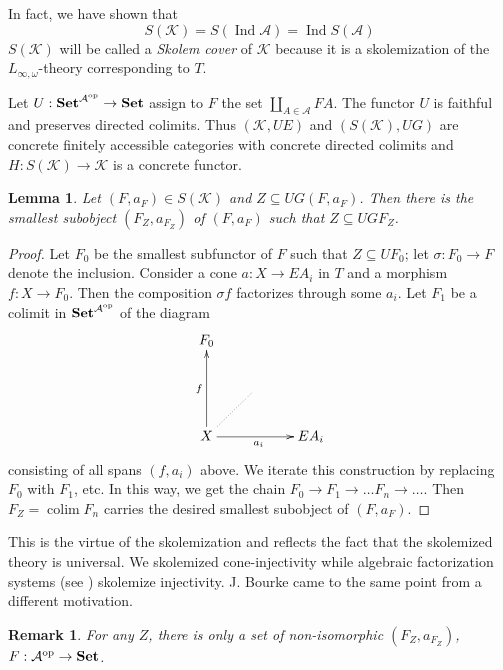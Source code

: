 \documentclass[12pt]{amsart}
\newtheorem{lemma}[theo]{Lemma}
\newtheorem{rem}[theo]{Remark}
\newcommand\Ind{\operatorname{Ind}}
\newcommand\op{\operatorname{op}}
\newcommand\Set{\operatorname{\bf Set}}
\newcommand\colim{\operatorname{colim}}
\newcommand\ca{\mathcal {A}}
\newcommand\ck{\mathcal {K}}
\begin{document}
In fact, we have shown that
$$
S(\ck)=S(\Ind\ca)=\Ind S(\ca)
$$
$S(\ck)$ will be called a \textit{Skolem cover} of $\ck$ because it is a skolemization of the $L_{\infty,\omega}$-theory corresponding to $T$.

Let $U:\Set^{\ca^{\op}}\to\Set$ assign to $F$ the set $\coprod_{A\in\ca}FA$. The functor $U$ is faithful and preserves directed colimits. Thus
$(\ck,UE)$ and $(S(\ck),UG)$ are concrete finitely accessible categories with concrete directed colimits and $H:S(\ck)\to \ck$ is a concrete
functor. 

\begin{lemma}\label{le2.2}
Let $(F,a_F)\in S(\ck)$ and $Z\subseteq UG(F,a_F)$. Then there is the smallest subobject $(F_Z,a_{F_Z})$ of $(F,a_F)$ such that $Z\subseteq UGF_Z$.
\end{lemma}
\begin{proof}
Let $F_0$ be the smallest subfunctor of $F$ such that $Z\subseteq UF_0$; let $\sigma:F_0\to F$ denote the inclusion. Consider a cone $a:X\to EA_i$ 
in $T$ and a morphism $f:X\to F_0$. Then the composition $\sigma f$ factorizes through some $a_i$. Let $F_1$ be a colimit in $\Set^{\ca^{\op}}$
of the diagram 
$$
\xymatrix{
F_0 \\
&&\\
X\ar[uu]^f  \ar@{.}[ur] \ar [rr]_{a_i} && EA_i
}
$$
consisting of all spans $(f,a_i)$ above. We iterate this construction by replacing $F_0$ with $F_1$, etc. In this way, we get the chain
$F_0\to F_1\to\dots F_n\to\dots$. Then $F_Z=\colim F_n$ carries the desired smallest subobject of $(F,a_F)$.
\end{proof}


This is the virtue of the skolemization and reflects the fact that the skolemized theory is universal. We skolemized cone-injectivity while
algebraic factorization systems (see \cite{GT}) skolemize injectivity. J. Bourke \cite{B} came to the same point from a different motivation.

\begin{rem}\label{re2.3}
{
\em
For any $Z$, there is only a set of non-isomorphic $(F_Z,a_{F_Z})$, $F:\ca^{\op}\to\Set$.
}
\end{rem}
\end{document}
